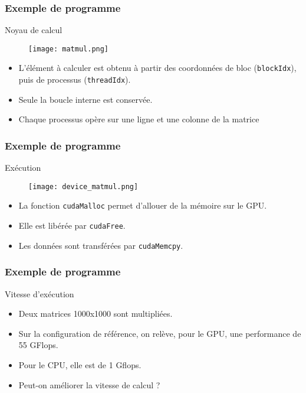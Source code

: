 \begin{frame}
    \frametitle{Exemple de programme}
\begin{block}{Noyau de calcul}
   \begin{figure}
    \centering
   \texttt{[image: matmul.png]}
   \end{figure}
   \begin{itemize}
    \item<+-> L'élément à calculer est obtenu à partir des coordonnées de bloc (\texttt{blockIdx}), puis de processus
    (\texttt{threadIdx}).
    \item<+-> Seule la boucle interne est conservée.
    \item<+-> Chaque processus opère sur une ligne et une colonne de la matrice
   \end{itemize}
\end{block}
\end{frame}

\begin{frame}
    \frametitle{Exemple de programme}
\begin{block}{Exécution}
   \begin{figure}
    \centering
   \texttt{[image: device\_matmul.png]}
   \end{figure}
   \begin{itemize}
    \item<+-> La fonction \texttt{cudaMalloc} permet d'allouer de la mémoire sur le GPU.
    \item<+-> Elle est libérée par \texttt{cudaFree}.
    \item<+-> Les données sont transférées par \texttt{cudaMemcpy}.
   \end{itemize}
\end{block}
\end{frame}

\begin{frame}
    \frametitle{Exemple de programme}
\begin{block}{Vitesse d'exécution}
   \begin{itemize}
    \item<+-> Deux matrices 1000x1000 sont multipliées.
    \item<+-> Sur la configuration de référence, on relève, pour le GPU, une performance de 55 GFlops.
    \item<+-> Pour le CPU, elle est de 1 Gflops.
    \item<+-> Peut-on améliorer la vitesse de calcul ?
   \end{itemize}
\end{block}
\end{frame}

